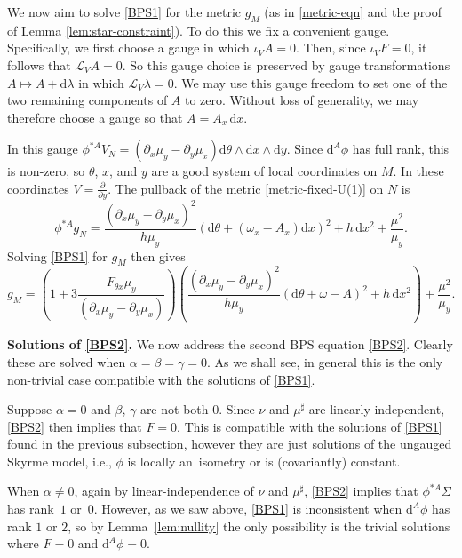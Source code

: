 \documentclass[pdftex]{sigma}
\newcommand{\1}{{\mathbb{1}}}
\def \d{\mathrm{d}}
\numberwithin{equation}{section}
\begin{document}
We now aim to solve \eqref{BPS1} for the metric $g_M$ (as in \eqref{metric-eqn} and the proof of Lemma \ref{lem:star-constraint}). To do this we fix a convenient gauge. Specifically, we first choose a gauge in which $\iota_V A=0$. Then, since $\iota_VF = 0$, it follows that $\mathcal{L}_VA=0$. So this gauge choice is preserved by gauge transformations $A\mapsto A+\d\lambda$ in which $\mathcal{L}_V\lambda=0$. We may use this gauge freedom to set one of the two remaining components of $A$ to zero. Without loss of generality, we may therefore choose a gauge so that $A=A_x\,\d x$.

In this gauge $\phi^{\ast A} V_N=(\partial_x\mu_y-\partial_y\mu_x)\d\theta\wedge \d x\wedge \d y$. Since $\d^A\phi$ has full rank, this is non-zero, so $\theta$, $x$, and $y$ are a good system of local coordinates on $M$. In these coordinates $V=\frac{\partial}{\partial y}$. The pullback of the metric \eqref{metric-fixed-U(1)} on $N$ is
\begin{equation*}
\phi^{\ast A}g_N = \frac{(\partial_x\mu_y-\partial_y\mu_x)^2}{h\mu_y}(\d\theta+(\omega_x-A_x)\d x)^2 + h\,\d x^2 + \frac{\mu^2}{\mu_y}.
\end{equation*}
Solving \eqref{BPS1} for $g_M$ then gives
\begin{equation}\label{metric-sol-U1}
g_M = \left(1+3\frac{F_{\theta x}\mu_y}{(\partial_x\mu_y-\partial_y\mu_x)}\right)\left(\frac{(\partial_x\mu_y-\partial_y\mu_x)^2}{h\mu_y}(\d\theta+\omega-A)^2 + h\,\d x^2\right) + \frac{\mu^2}{\mu_y}.
\end{equation}

{\bf Solutions of \eqref{BPS2}.} We now address the second BPS equation \eqref{BPS2}. Clearly these are solved when $\alpha=\beta=\gamma=0$. As we shall see, in general this is the only non-trivial case compatible with the solutions of \eqref{BPS1}.

Suppose $\alpha=0$ and $\beta$, $\gamma$ are not both $0$. Since $\nu$ and $\mu^\sharp$ are linearly independent, \eqref{BPS2} then implies that $F=0$. This is compatible with the solutions of \eqref{BPS1} found in the previous subsection, however they are just solutions of the ungauged Skyrme model, i.e., $\phi$ is locally an~isometry or is (covariantly) constant.

When $\alpha\neq0$, again by linear-independence of $\nu$ and $\mu^\sharp$, \eqref{BPS2} implies that $\phi^{\ast A}\Sigma$ has rank~$1$ or~$0$. However, as we saw above, \eqref{BPS1} is inconsistent when $\d^A\phi$ has rank $1$ or $2$, so by Lemma~\ref{lem:nullity} the only possibility is the trivial solutions where $F=0$ and $\d^A\phi=0$.
\end{document}
